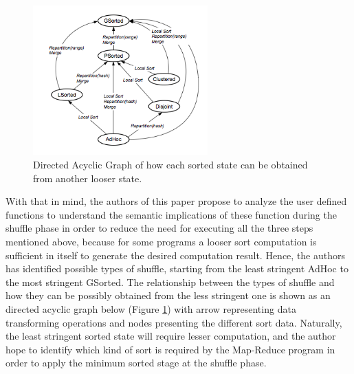 \documentclass[]{article}
\begin{document}
\begin{figure}[here]
	\begin{center}
		\includegraphics[width=0.6\textwidth]{parallel11.png}
		\caption{Directed Acyclic Graph of how each sorted state can be obtained from another looser state. }
		\label{fig:parallel11}
	\end{center}
\end{figure}

With that in mind, the authors of this paper propose to analyze the user defined functions to understand the semantic implications of these function during the shuffle phase in order to reduce the need for executing all the three steps mentioned above, because for some programs a looser sort computation is sufficient in itself to generate the desired computation result. Hence, the authors has identified possible types of shuffle, starting from the least stringent AdHoc to the most stringent GSorted. The relationship between the types of shuffle and how they can be possibly obtained from the less stringent one is shown as an directed acyclic graph below (Figure \ref{fig:parallel11}) with arrow representing data transforming operations and nodes presenting the different sort data. Naturally, the least stringent sorted state will require lesser computation, and the author hope to identify which kind of sort is required by the Map-Reduce program in order to apply the minimum sorted stage at the shuffle phase. \\
\end{document}
